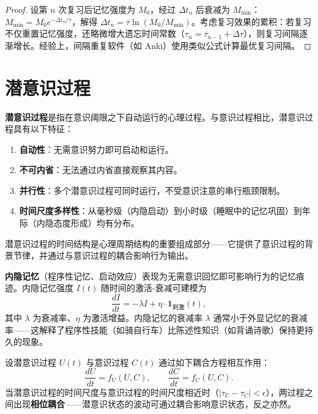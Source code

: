 \begin{proof}
设第 $n$ 次复习后记忆强度为 $M_0$，经过 $\Delta t_n$ 后衰减为 $M_{\min}$：$M_{\min} = M_0 e^{-\Delta t_n/\tau}$，解得 $\Delta t_n = \tau \ln(M_0/M_{\min})$。考虑复习效果的累积：若复习不仅重置记忆强度，还略微增大遗忘时间常数（$\tau_n = \tau_{n-1} + \Delta\tau$），则复习间隔逐渐增长。经验上，间隔重复软件（如 Anki）使用类似公式计算最优复习间隔。
\end{proof}

\section{潜意识过程}

\begin{definition}[潜意识过程]\label{def:subconscious_process}
\textbf{潜意识过程}是指在意识阈限之下自动运行的心理过程。与意识过程相比，潜意识过程具有以下特征：
\begin{enumerate}[label=(\roman*)]
    \item \textbf{自动性}：无需意识努力即可启动和运行。
    \item \textbf{不可内省}：无法通过内省直接观察其内容。
    \item \textbf{并行性}：多个潜意识过程可同时运行，不受意识注意的串行瓶颈限制。
    \item \textbf{时间尺度多样性}：从毫秒级（内隐启动）到小时级（睡眠中的记忆巩固）到年际（内隐态度形成）均有分布。
\end{enumerate}
潜意识过程的时间结构是心理周期结构的重要组成部分——它提供了意识过程的背景节律，并通过与意识过程的耦合影响行为输出。
\end{definition}

\begin{definition}\label{def:implicit_memory}
\textbf{内隐记忆}（程序性记忆、启动效应）表现为无需意识回忆即可影响行为的记忆痕迹。内隐记忆强度 $I(t)$ 随时间的激活-衰减可建模为
\[
\frac{dI}{dt} = -\lambda I + \eta \cdot \mathbf{1}_{\text{刺激}}(t),
\]
其中 $\lambda$ 为衰减率、$\eta$ 为激活增益。内隐记忆的衰减率 $\lambda$ 通常小于外显记忆的衰减率——这解释了程序性技能（如骑自行车）比陈述性知识（如背诵诗歌）保持更持久的现象。
\end{definition}

\begin{proposition}[潜意识周期与意识周期的耦合]\label{prop:subconscious_conscious_coupling}
设潜意识过程 $U(t)$ 与意识过程 $C(t)$ 通过如下耦合方程相互作用：
\[
\frac{dU}{dt} = f_U(U, C), \qquad \frac{dC}{dt} = f_C(U, C).
\]
当潜意识过程的时间尺度与意识过程的时间尺度相近时（$|\tau_U - \tau_C| < \epsilon$），两过程之间出现\textbf{相位耦合}——潜意识状态的波动可通过耦合影响意识状态，反之亦然。
\end{proposition}

